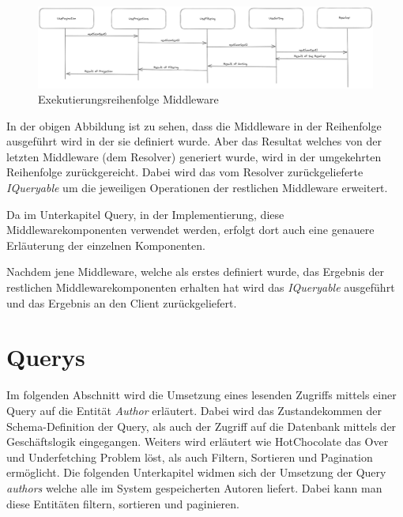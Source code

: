 \begin{figure}[H]
    \includegraphics[width=\textwidth]{pics/middleware.png}
    \caption{Exekutierungsreihenfolge Middleware}
\end{figure}

In der obigen Abbildung ist zu sehen, dass die Middleware in der Reihenfolge ausgeführt wird in der sie definiert wurde.
Aber das Resultat welches von der letzten Middleware (dem Resolver) generiert wurde, wird in der umgekehrten Reihenfolge zurückgereicht.
Dabei wird das vom Resolver zurückgelieferte \textit{IQueryable} um die jeweiligen Operationen der restlichen Middleware erweitert.
\newline

Da im Unterkapitel Query, in der Implementierung, diese Middlewarekomponenten verwendet werden, erfolgt dort auch eine genauere Erläuterung der einzelnen Komponenten.

Nachdem jene Middleware, welche als erstes definiert wurde, das Ergebnis der restlichen Middlewarekomponenten erhalten hat wird das \textit{IQueryable} ausgeführt und das Ergebnis an den Client zurückgeliefert.

\section{Querys}
Im folgenden Abschnitt wird die Umsetzung eines lesenden Zugriffs mittels einer Query auf die Entität \textit{Author} erläutert.
Dabei wird das Zustandekommen der Schema-Definition der Query, als auch der Zugriff auf die Datenbank mittels der Geschäftslogik eingegangen.
Weiters wird erläutert wie HotChocolate das Over und Underfetching Problem löst, als auch Filtern, Sortieren und Pagination ermöglicht.
\newline
Die folgenden Unterkapitel widmen sich der Umsetzung der Query \textit{authors} welche alle im System gespeicherten Autoren liefert.
Dabei kann man diese Entitäten filtern, sortieren und paginieren. %

